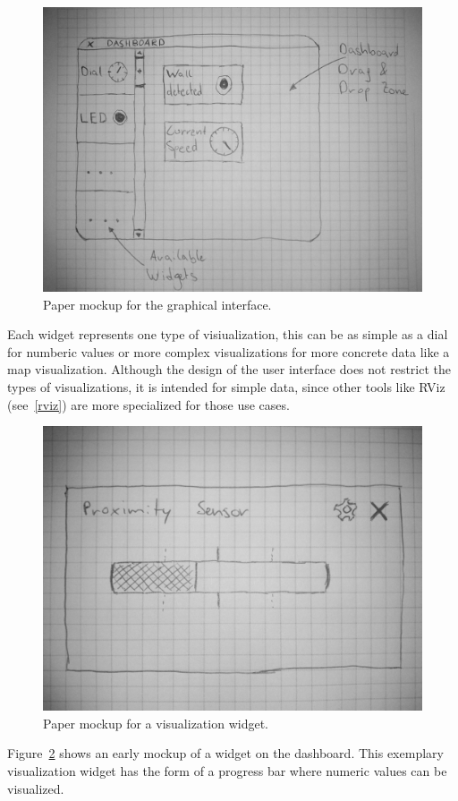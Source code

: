 \begin{figure}[htbp]
  \centering
  \includegraphics[width=\textwidth]{img/initial_gui_mockup.jpg}
  \caption{Paper mockup for the graphical interface.}
  \label{gui_mockup}
\end{figure}

Each widget represents one type of visiualization, this can be as simple as a dial for numberic values or more complex visualizations for more concrete data like a map visualization. Although the design of the user interface does not restrict the types of visualizations, it is intended for simple data, since other tools like RViz (see~\ref{rviz}) are more specialized for those use cases.

\begin{figure}[htbp]
  \centering
  \includegraphics[width=.5\textwidth]{img/initial_widget_mockup.jpg}
  \caption{Paper mockup for a visualization widget.}
  \label{widget_mockup}
\end{figure}

Figure~\ref{widget_mockup} shows an early mockup of a widget on the dashboard. This exemplary visualization widget has the form of a progress bar where numeric values can be visualized.
